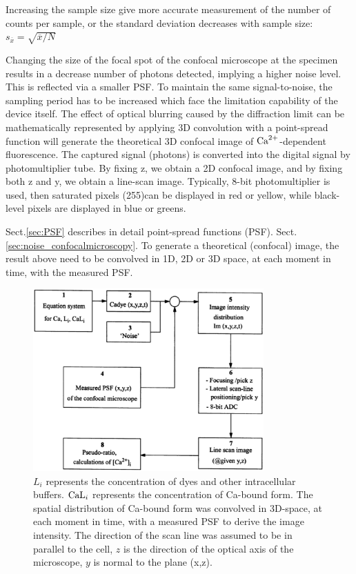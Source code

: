 \begin{framed}
Increasing the sample size give more accurate measurement of the number of
counts per sample, or the standard deviation decreases with sample size:
$s_{\overline{x}}=\sqrt{\overline{x}/N}$
\end{framed}

Changing the size of the focal spot of the confocal microscope at the specimen
results in a decrease number of photons detected, implying a higher noise level.
This is reflected via a smaller PSF. To maintain the same signal-to-noise, the
sampling period has to be increased which face the limitation capability of the
device itself. The effect of optical blurring caused by the diffraction limit
can be mathematically represented by applying 3D convolution with a point-spread
function will generate the theoretical 3D confocal image of ${\text{Ca}^{2+}}$-dependent
fluorescence. The captured signal (photons) is converted into the digital signal
by photomultiplier tube. By fixing z, we obtain a 2D confocal image, and by
fixing both z and y, we obtain a line-scan image.  Typically, 8-bit
photomultiplier is used, then saturated pixels (255)can be displayed in red or
yellow, while black-level pixels are displayed in blue or  greens.


Sect.\ref{sec:PSF} describes in detail point-spread functions (PSF).
Sect.\ref{sec:noise_confocalmicroscopy}. To generate a theoretical (confocal)
image, the result above need to be convolved in 1D, 2D or 3D space, at each
moment in time, with the measured PSF.

\begin{figure}[hbt]
  \centerline{\includegraphics[height=7cm,
    angle=0]{./images/pratusevich_spark.eps}}
  \caption{$L_i$ represents the concentration of dyes and other
    intracellular buffers. $\ce{CaL_i}$ represents the concentration of
    Ca-bound form. The spatial distribution of Ca-bound form was
    convolved in 3D-space, at each moment in time, with a measured PSF
    to derive the image intensity. The direction of the scan line was
    assumed to be in parallel to the cell, $z$ is the direction of the
    optical axis of the microscope, $y$ is normal to the plane (x,z).}
  \label{fig:pratusevich_spark}
\end{figure}


